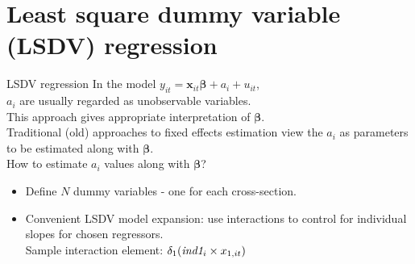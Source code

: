 \documentclass[usenames,dvipsnames]{beamer}
\newcommand{\mytikzmark}[2]{%
  \tikz[remember picture,inner sep=0pt,outer sep=0pt,baseline,anchor=base] 
    \node (#1) {\ensuremath{#2}};}
\begin{document}
\section{Least square dummy variable (LSDV) regression}
\begin{frame}{LSDV regression}
In the model $y_{it} = \bm{x}_{it} \bm{\beta} + a_i + u_{it}$, \\
\medskip
$a_i$ are usually regarded as unobservable variables. \\
This approach gives appropriate interpretation of $\bm{\beta}$. \\
Traditional (old) approaches to fixed effects estimation view the $a_i$ as parameters to be estimated along with $\bm{\beta}$. \\
\medskip
How to estimate $a_i$ values along with $\bm{\beta}$?
\begin{itemize}
\item Define $N$ dummy variables - one for each cross-section.
\item Convenient LSDV model expansion: use interactions to control for individual slopes for chosen regressors. \\
Sample interaction element: \quad $\mytikzmark{delta}{\delta_1} (\mytikzmark{ind}{\textit{ind1}_i} \times \mytikzmark{x}{x_{1, it}})$ 
\end{itemize}
\end{frame}
\end{document}
